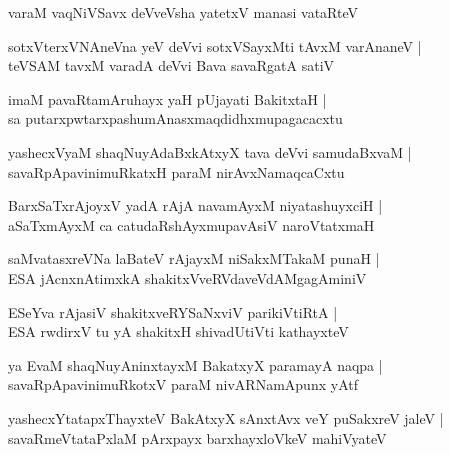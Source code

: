 \begin{shloka}
varaM vaqNiVSavx deVveVsha yatetxV manasi vataRteV
\end{shloka}

\begin{shloka}
sotxVterxVNAneVna yeV deVvi sotxVSayxMti tAvxM varAnaneV |\\
teVSAM tavxM varadA deVvi Bava savaRgatA satiV
\end{shloka}

\begin{shloka}
imaM pavaRtamAruhayx yaH pUjayati BakitxtaH |\\
sa putarxpwtarxpashumAnasxmaqdidhxmupagacacxtu
\end{shloka}

\begin{shloka}
yashecxVyaM shaqNuyAdaBxkAtxyX tava deVvi samudaBxvaM |\\
savaRpApavinimuRkatxH paraM nirAvxNamaqcaCxtu
\end{shloka}

\begin{shloka}
BarxSaTxrAjoyxV yadA rAjA navamAyxM niyatashuyxciH |\\
aSaTxmAyxM ca catudaRshAyxmupavAsiV naroVtatxmaH 
\end{shloka}

\begin{shloka}
saMvatasxreVNa laBateV rAjayxM niSakxMTakaM punaH |\\
ESA jAcnxnAtimxkA shakitxVveRVdaveVdAMgagAminiV
\end{shloka}

\begin{shloka}
ESeYva rAjasiV shakitxveRYSaNxviV parikiVtiRtA |\\
ESA rwdirxV tu yA shakitxH shivadUtiVti kathayxteV
\end{shloka}

\begin{shloka}
ya EvaM shaqNuyAninxtayxM BakatxyX paramayA naqpa |\\
savaRpApavinimuRkotxV paraM nivARNamApunx yAtf
\end{shloka}

\begin{shloka}
yashecxYtatapxThayxteV BakAtxyX sAnxtAvx veY puSakxreV jaleV |\\
savaRmeVtataPxlaM pArxpayx barxhayxloVkeV mahiVyateV 
\end{shloka}

